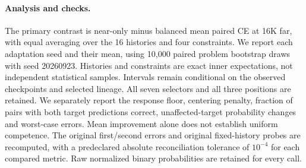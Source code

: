 \paragraph{Analysis and checks.}
The primary contrast is near-only minus balanced mean paired CE at 16K far,
with equal averaging over the 16 histories and four constraints. We report
each adaptation seed and their mean, using 10,000 paired problem bootstrap
draws with seed 20260923. Histories and constraints are exact inner
expectations, not independent statistical samples. Intervals remain
conditional on the observed checkpoints and selected lineage. All seven
selectors and all three positions are retained. We separately report the
response floor, centering penalty, fraction of pairs with both target
predictions correct, unaffected-target probability changes and worst-case
errors. Mean improvement alone does not establish uniform competence.
The original first/second errors and original fixed-history probes are
recomputed, with a predeclared absolute reconciliation tolerance of $10^{-4}$
for each compared metric. Raw normalized binary probabilities are retained
for every call.


